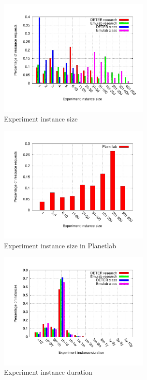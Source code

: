 \begin{figure}[htbp] \begin{center}
\includegraphics[width=3in,type=pdf,ext=.pdf,read=.pdf]
{figs/exp.size.gnu} \caption{Experiment instance size} \label{expsize} \end{center}
\end{figure}

\begin{figure}[htbp] \begin{center}
\includegraphics[width=3in,type=pdf,ext=.pdf,read=.pdf]
{figs/planet.size.gnu} \caption{Experiment instance size in Planetlab} \label{expsize}
\end{center} \end{figure}

\begin{figure}[htbp] \begin{center} \includegraphics[width=3in,
type=pdf,ext=.pdf,read=.pdf]{figs/exp.dur.gnu} \caption{Experiment
instance duration} \label{expdur} \end{center} \end{figure}

